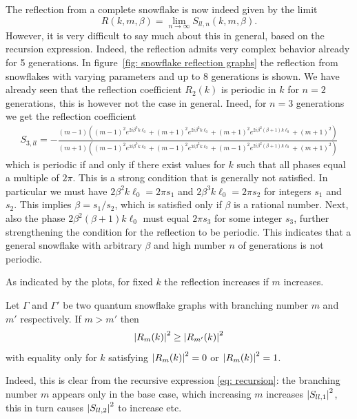 The reflection from a complete snowflake is now indeed given by the limit
\[
  R(k,m,\beta) = \lim_{n\to\infty} S_{ll,n}(k,m,\beta).
\]
However, it is very difficult to say much about this in general, based on the recursion expression. Indeed, the reflection admits very complex behavior already for 5 generations. In figure~\ref{fig: snowflake reflection graphs} the reflection from snowflakes with varying parameters and up to 8 generations is shown. We have already seen that the reflection coefficient $R_2(k)$ is periodic in $k$ for $n=2$ generations, this is however not the case in general. Ineed, for $n=3$ generations we get the reflection coefficient
\begin{multline*}
  S_{3,ll} = -\frac{(m-1) \left((m-1)^2 e^{2 i \beta^3 k \ell_0}+(m+1)^2 e^{2 i \beta^2 k \ell_0}+(m+1)^2 e^{2 i \beta^2 (\beta+1) k
     \ell_0}+(m+1)^2\right)}{(m+1) \left((m-1)^2 e^{2 i \beta^3 k \ell_0}+(m-1)^2 e^{2 i \beta^2 k \ell_0}+(m-1)^2 e^{2 i \beta^2
     (\beta+1) k \ell_0}+(m+1)^2\right)}
\end{multline*}
which is periodic if and only if there exist values for $k$ such that all phases equal a multiple of $2\pi$. This is a strong condition that is generally not satisfied. In particular we must have $2\beta^2 k\ell_0 = 2\pi s_1$ and $2\beta^3 k\ell_0 = 2\pi s_2$ for integers $s_1$ and $s_2$. This implies $\beta = s_1/s_2$, which is satisfied only if $\beta$ is a rational number. Next, also the phase $2\beta^2(\beta+1)k\ell_0$ must equal $2\pi s_3$ for some integer $s_3$, further strengthening the condition for the reflection to be periodic. This indicates that a general snowflake with arbitrary $\beta$ and high number $n$ of generations is not periodic.

As indicated by the plots, for fixed $k$ the reflection increases if $m$ increases.
\begin{lemma}
  Let $\Gamma$ and $\Gamma'$ be two quantum snowflake graphs with branching number $m$ and $m'$ respectively. If $m > m'$ then
  \[
    \left\lvert R_m(k)\right\rvert^2 \ge \left\lvert R_{m'}(k)\right\rvert^2
  \]
  with equality only for $k$ satisfying $\left\lvert R_m(k)\right\rvert^2 = 0$ or $\left\lvert R_m(k)\right\rvert^2 = 1$.
\end{lemma}
\noindent Indeed, this is clear from the recursive expression \eqref{eq: recursion}: the branching number $m$ appears only in the base case, which increasing $m$ increases $\left\lvert S_{ll,1}\right\rvert^2$, this in turn causes $\left\lvert S_{ll,2}\right\rvert^2$ to increase etc.

